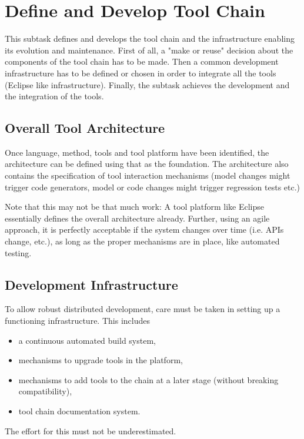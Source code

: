 \documentclass{template/openetcs_article}
\begin{document}
\section{Define and Develop Tool Chain}\label{sec:devtoolchain}


This subtask defines and develops the tool chain and the infrastructure enabling its evolution and maintenance. First of all, a "make or reuse" decision about the components of the tool chain has to be made. Then a common development infrastructure has to be defined or chosen in order to integrate all the tools (Eclipse like infrastructure). Finally, the subtask achieves the development and the integration of the tools.

\subsection{Overall Tool Architecture}

Once language, method, tools and tool platform have been identified, the architecture can be defined using that as the foundation.  The architecture also contains the specification of tool interaction mechanisms (model changes might trigger code generators, model or code changes might trigger regression tests etc.) 

Note that this may not be that much work:  A tool platform like Eclipse essentially defines the overall architecture already.  Further, using an agile approach, it is perfectly acceptable if the system changes over time (i.e. APIs change, etc.), as long as the proper mechanisms are in place, like automated testing.

\subsection{Development Infrastructure}

To allow robust distributed development, care must be taken in setting up a functioning infrastructure.  This includes 
\begin{itemize}
\item a continuous automated build system, 
\item mechanisms to upgrade tools in the platform, 
\item mechanisms to add tools to the chain at a later stage (without breaking compatibility),
\item tool chain documentation system. 
\end{itemize}
 The effort for this must not be underestimated.
\end{document}
